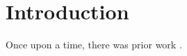 \documentclass{article}
\begin{document}
\section*{Introduction}

\noindent Once upon a time, there was prior work \cite{Ernst1987,Rugar2004jul,Isaac2016apr,Isaac2018jan}.



\end{document}
